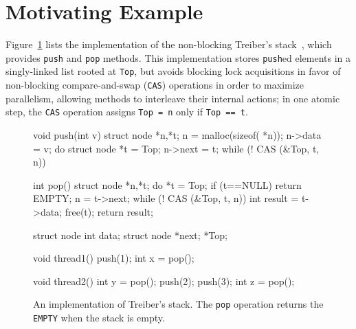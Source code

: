 
\section{Motivating Example}
\label{sec:motivation}

Figure~\ref{fig:treiber} lists the implementation of the non-blocking Treiber's
stack~\cite{Treiber'86}, which provides {\tt push} and {\tt pop} methods. This
implementation stores {\tt push}ed elements in a singly-linked list rooted at
{\tt Top}, but avoids blocking lock acquisitions in favor of non-blocking
compare-and-swap ({\tt CAS}) operations in order to maximize parallelism,
allowing methods to interleave their internal actions; in one atomic step, the
{\tt CAS} operation assigns {\tt Top = n} only if {\tt Top == t}.


\begin{figure}[t]
  \scriptsize
  \begin{minipage}[t]{45mm}
    \begin{program}
void push(int v) {
  struct node *n,*t;
  n = malloc(sizeof( *n));
  n->data = v;
  do {
    struct node *t = Top;
    n->next = t;
  } while (! CAS (&Top, t, n))
}

int pop() {
  struct node *n,*t;
  do {
    *t = Top;
    if (t==NULL) return EMPTY;
    n = t->next;
  } while (! CAS (&Top, t, n))
  int result = t->data;
  free(t);
  return result;
}
    \end{program}
  \end{minipage}
  \begin{minipage}[t]{35mm}
    \begin{program}
struct node {
  int data;
  struct node *next;
} *Top;  

void thread1() {
  push(1);
  int x = pop();
}

void thread2() {
  int y = pop();
  push(2);
  push(3);
  int z = pop();
}
    \end{program}
  \end{minipage}

  \caption{An implementation of Treiber's stack. The {\tt pop} operation
  returns the {\tt EMPTY} when the stack is empty.}
  \label{fig:treiber}
\end{figure}

